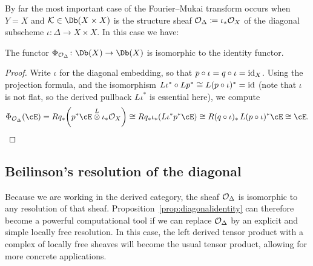 \documentclass{amsart}
\begin{document}
By far the most important case of the Fourier--Mukai transform occurs when $Y = X$ and $\cK \in \Db(X\times X)$ is the structure sheaf ${\mathcal O}_\Delta\coloneqq\iota_*{\mathcal O}_X$ of the diagonal subscheme $\iota\colon\Delta\to X\times X$\!.  In this case we have:

\begin{prop}\label{prop:diagonalidentity}
  The functor $\Phi_{\cO_\Delta}\colon \Db(X)\to \Db(X)$ is isomorphic to the identity functor.
\end{prop}
\begin{proof}
  Write $\iota$ for the diagonal embedding, so that $p\circ\iota=q\circ\iota=\operatorname{id}_X$. Using the projection formula, and the isomorphism $L\iota^*\circ Lp^*\cong L(p\circ\iota)^*=\operatorname{id}$ (note that $\iota$ is not flat, so the derived pullback $L\iota^*$ is essential here), we compute
  \[   \Phi_{\cO_\Delta}(\cE)=Rq_*\!\left(p^*\cE\Lotimes \iota_*\cO_X\right)\cong Rq_*\iota_*\!\left(L\iota^*p^*\cE\right)\cong R(q\circ\iota)_*\,L(p\circ\iota)^*\cE\cong \cE. \qedhere   \]
\end{proof}


\subsection{Beilinson's resolution of the diagonal}
Because we are working in the derived category, the sheaf ${\mathcal O}_{\Delta}$ is isomorphic to any resolution of that sheaf.  Proposition~\ref{prop:diagonalidentity} can therefore become a powerful computational tool if we can replace ${\mathcal O}_\Delta$ by an explicit and simple locally free resolution. In this case, the left derived tensor product with a complex of locally free sheaves will become the usual tensor product, allowing for more concrete applications.
\end{document}
